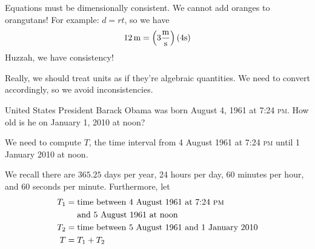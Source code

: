  Equations must be
dimensionally consistent. We cannot add oranges to orangutans!
For example: $d = rt$, so we have
\begin{equation}
\SI{12}{\meter} =
\left(3\frac{\si{\meter}}{\si{\highlight{red}\cancel{\second}}}\right)(4\si{\highlight{red}\cancel{\second}})
\end{equation}
Huzzah, we have consistency!

Really, we should treat units as if they're algebraic
quantities. We need to convert accordingly, so we avoid
inconsistencies.

United States President Barack Obama was born August 4, 1961 at
7:24 \textsc{pm}. How old is he on January 1, 2010 at noon?

\IDENTIFY
We need to compute $T$, the time interval from 4 August 1961 at
7:24 \textsc{pm} until 1 January 2010 at noon.

\SETUP
We recall there are $365.25$ days per year, 24 hours per day, 60
minutes per hour, and 60 seconds per minute. Furthermore, let
\begin{subequations}
\begin{align}
T_{1}&=\mbox{time between 4 August 1961 at 7:24 \textsc{pm}}\nonumber\\
&\quad\mbox{ and 5
August 1961 at noon}\\
T_{2}&=\mbox{time between 5 August 1961 and 1 January 2010}\\
T &= T_{1}+T_{2}
\end{align}
\end{subequations}

